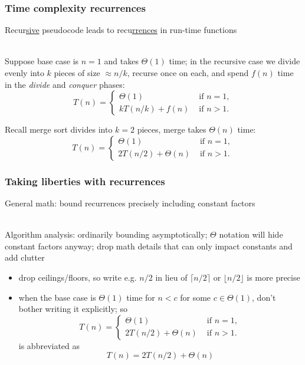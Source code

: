 \documentclass[10pt,aspectratio=169]{beamer}
\newcommand{\stanza}{ \\~\ }
\begin{document}
\begin{frame} \frametitle{Time complexity recurrences}

Recur\underline{sive} pseudocode leads to recu\underline{rrences} in
  run-time functions \stanza

Suppose base case is $n=1$ and takes $\Theta(1)$ time; in the recursive
case we divide evenly into $k$ pieces of size $\approx n/k$, recurse once
on each, and spend $f(n)$ time in the \emph{divide} and \emph{conquer}
phases:
\begin{equation*}
  T(n) = \begin{cases}
          \Theta(1) & \text{ if } n=1, \\
          k T(n/k) + f(n) & \text{ if } n > 1 .
        \end{cases}
\end{equation*}

Recall merge sort divides into $k=2$ pieces, merge takes $\Theta(n)$ time:
\begin{equation*}
  T(n) = \begin{cases}
          \Theta(1) & \text{ if } n=1, \\
          2 T(n/2) + \Theta(n) & \text{ if } n > 1 .
        \end{cases}
\end{equation*}
\end{frame}

\begin{frame} \frametitle{Taking liberties with recurrences}
  General math: bound recurrences precisely including constant factors \stanza

  Algorithm analysis: ordinarily bounding asymptotically; $\Theta$ notation will
    hide constant factors anyway; drop math details that can only impact
    constants and add clutter
  \begin{itemize}
    \item drop ceilings/floors, so write e.g. $n/2$ in lieu of $\lceil n/2 \rceil$ or $\lfloor n/2 \rfloor$
      is more precise
    \item when the base case is $\Theta(1)$ time for $n < c$ for some $c \in \Theta(1)$,
      don't bother writing it explicitly; so
      \begin{equation*}
        T(n) = \begin{cases}
                \Theta(1) & \text{ if } n=1, \\
                2 T(n/2) + \Theta(n) & \text{ if } n > 1 .
              \end{cases}
      \end{equation*}
      is abbreviated as
      \[ T(n) = 2 T(n/2) + \Theta(n) \]
    \end{itemize}

\end{frame}
\end{document}
